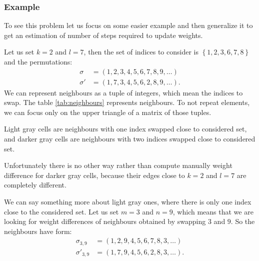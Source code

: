 	\subsubsection{Example}
		To see this problem let us focus on some easier example and then generalize it to get an estimation of number of steps required to update weights.
		
		Let us set $k=2$ and $l=7$, then the set of indices to consider is $\left\{ 1,2,3,6,7,8 \right\}$ and the permutations:
		\begin{align*}
			\sigma &= (1, 2, 3, 4, 5, 6, 7, 8, 9, \ldots) \\
			\sigma' &= (1, 7, 3, 4, 5, 6, 2, 8, 9, \ldots).
		\end{align*}
		We can represent neighbours as a tuple of integers, which mean the indices to swap. The table \ref{tab:neighbours} represents neighbours. To not repeat elements, we can focus only on the upper triangle of a matrix of those tuples.
		
		
		
		Light gray cells are neighbours with one index swapped close to considered set, and darker gray cells are neighbours with two indices swapped close to considered set. 
		
		Unfortunately there is no other way rather than compute manually weight difference for darker gray cells, because their edges close to $k=2$ and $l=7$ are completely different. 
		
		We can say something more about light gray ones, where there is only one index close to the considered set. Let us set $m=3$ and $n=9$, which means that we are looking for weight differences of neighbours obtained by swapping $3$ and $9$. So the neighbours have form:
		\begin{align*}
			\sigma_{3,9} &= (1, 2, 9, 4, 5, 6, 7, 8, 3, \ldots) \\
			\sigma'_{3,9} &= (1, 7, 9, 4, 5, 6, 2, 8, 3, \ldots).
		\end{align*}
		
